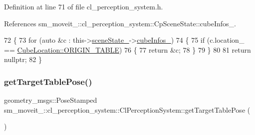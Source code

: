 Definition at line 71 of file cl\+\_\+perception\+\_\+system.\+h.



References sm\+\_\+moveit\+\_\+::cl\+\_\+perception\+\_\+system\+::\+Cp\+Scene\+State\+::cube\+Infos\+\_\+.


\begin{DoxyCode}
72             \{
73                 \textcolor{keywordflow}{for} (\textcolor{keyword}{auto} &c : this->\hyperlink{classsm__moveit__4_1_1cl__perception__system_1_1ClPerceptionSystem_a82ea8feeb2fa43349f91ed59137b3890}{sceneState\_}->\hyperlink{classsm__moveit__4_1_1cl__perception__system_1_1CpSceneState_a734a45934cccf19ac5c886cd94bc8cda}{cubeInfos\_})
74                 \{
75                     \textcolor{keywordflow}{if} (c.location\_ == \hyperlink{namespacesm__moveit__4_1_1cl__perception__system_a0d1b8834532a7cf9d19670791eece6d1ae5ee34c3ef8ec4a46a00a218416c7b1d}{CubeLocation::ORIGIN\_TABLE})
76                     \{
77                         \textcolor{keywordflow}{return} &c;
78                     \}
79                 \}
80 
81                 \textcolor{keywordflow}{return} \textcolor{keyword}{nullptr};
82             \}
\end{DoxyCode}
\mbox{\label{classsm__moveit__4_1_1cl__perception__system_1_1ClPerceptionSystem_a84da4b68fddd1b2c81d69d5f7aafeb94}} 
\subsubsection{\texorpdfstring{get\+Target\+Table\+Pose()}{getTargetTablePose()}}
{\footnotesize\ttfamily geometry\+\_\+msgs\+::\+Pose\+Stamped sm\+\_\+moveit\+\_\+::cl\+\_\+perception\+\_\+system\+::\+Cl\+Perception\+System\+::get\+Target\+Table\+Pose (\begin{DoxyParamCaption}{ }\end{DoxyParamCaption})\hspace{0.3cm}{\ttfamily [inline]}}



